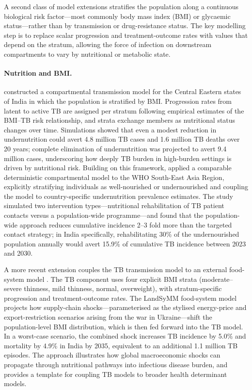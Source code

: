 \documentclass[11pt]{article}
\begin{document}
A second class of model extensions stratifies the population along a continuous biological risk factor---most commonly body mass index (BMI) or glycaemic status---rather than by transmission or drug-resistance status. The key modelling step is to replace scalar progression and treatment-outcome rates with values that depend on the stratum, allowing the force of infection on downstream compartments to vary by nutritional or metabolic state.

\paragraph{Nutrition and BMI.}
\citet{oxlade2015undernutrition} constructed a compartmental transmission model for the Central Eastern states of India in which the population is stratified by BMI. Progression rates from latent to active TB are assigned per stratum following empirical estimates of the BMI--TB risk relationship, and strata exchange members as nutritional status changes over time. Simulations showed that even a modest reduction in undernutrition could avert 4.8 million TB cases and 1.6 million TB deaths over 20 years; complete elimination of undernutrition was projected to avert 9.4 million cases, underscoring how deeply TB burden in high-burden settings is driven by nutritional risk. Building on this framework, \citet{mandal2024undernutrition} applied a comparable deterministic compartmental model to the WHO South-East Asia Region, explicitly stratifying individuals as well-nourished or undernourished and coupling the model to country-specific undernutrition prevalence estimates. The study simulated two intervention types---nutritional rehabilitation of TB patient contacts versus a population-wide programme---and found that the population-wide approach reduces cumulative incidence 2--3 fold more than the targeted contact strategy; in India specifically, rehabilitating 30\% of the undernourished population annually would avert 15.9\% of cumulative TB incidence between 2023 and 2030.

A more recent extension couples the TB transmission model to an external food-system model \citep{clark2025nutritional}. The TB component uses four explicit BMI strata (moderate--severe thinness, mild thinness, normal, overweight), with stratum-specific progression and treatment-outcome rates. The LandSyMM food-system model projects how supply-chain shocks---parameterised as the stylised energy-price and export-restriction scenarios arising from the war in Ukraine---shift the population-level BMI distribution, which is then fed forward into the TB model. In a worst-case scenario, the combined shock increases TB incidence by 5.0\% and mortality by 4.9\% in India by 2035, equivalent to an additional 1.1 million TB episodes. The approach illustrates how global macroeconomic shocks can propagate through nutritional pathways into infectious disease burden, and provides a template for coupling TB models to broader health determinant models.
\end{document}
